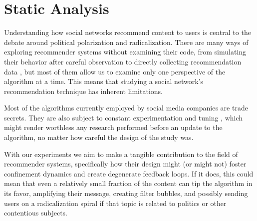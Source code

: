 





\chapter{Static Analysis}
\label{cap:static}

Understanding how social networks recommend content to users is central to the
debate around political polarization and radicalization. There are many ways of
exploring recommender systems without examining their code, from simulating
their behavior after careful observation \citep{yao_measuring_2021} to directly
collecting recommendation data \citep{ribeiro_auditing_2020}, but most of them
allow us to examine only one perspective of the algorithm at a time. This means
that studying a social network's recommendation technique has inherent
limitations.

Most of the algorithms currently employed by social media companies are trade
secrets. They are also subject to constant experimentation and tuning
\citep{noauthor_congratulations_2020}, which might render worthless any research
performed before an update to the algorithm, no matter how careful the design of
the study was.

With our experiments we aim to make a tangible contribution to the field of
recommender systems, specifically how their design might (or might not) foster
confinement dynamics and create degenerate feedback loops. If it does, this
could mean that even a relatively small fraction of the content can tip the
algorithm in its favor, amplifying their message, creating filter bubbles, and
possibly sending users on a radicalization spiral if that topic is related to
politics or other contentious subjects.

